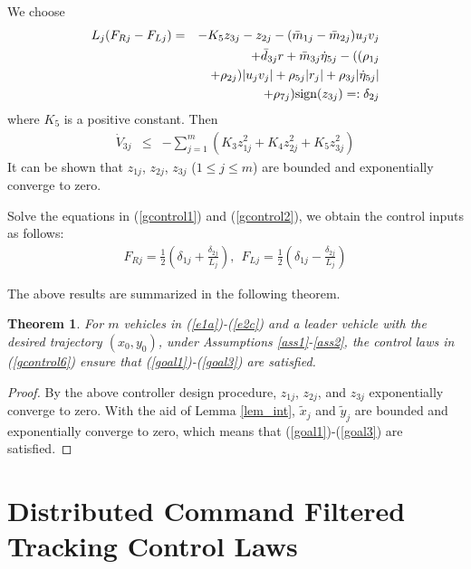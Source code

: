 \documentclass[letterpaper, 10 pt, conference]{ieeeconf}  %
\newtheorem{theorem}{Theorem}
\begin{document}
We choose
\begin{eqnarray}
L_j(F_{Rj}-F_{Lj})&=&-K_5z_{3j}-z_{2j}-(\bar{m}_{1j}-\bar{m}_{2j})u_jv_j\nonumber\\
&&+\bar{d}_{3j}r+\bar{m}_{3j}\dot{{\eta}}_{5j}-((\rho_{1j}\nonumber\\
&&+\rho_{2j})|u_jv_j|+\rho_{5j}|r_j|+\rho_{3j}|\dot{{\eta}}_{5j}|\nonumber\\
&&+\rho_{7j}){\rm sign}(z_{3j})=:\delta_{2j}\label{gcontrol2}
\end{eqnarray}
where $K_5$ is a positive constant. Then
\begin{eqnarray*}
\dot{V}_{3j}&\leq &
-\sum^m_{j=1}(K_{3}z^2_{1j}+K_{4}z^2_{2j}+K_5z^2_{3j})
\end{eqnarray*}
It can be shown
that  $z_{1j}$, $z_{2j}$, $z_{3j}$ ($1\leq j\leq m$) are bounded and
exponentially converge to zero.

Solve the equations in (\ref{gcontrol1}) and (\ref{gcontrol2}), we
obtain the control inputs as follows:
\begin{eqnarray}
F_{Rj}=\frac{1}{2}\left(\delta_{1j}+\frac{\delta_{2j}}{L_j} \right),~~
F_{Lj}=\frac{1}{2}\left(\delta_{1j}-\frac{\delta_{2j}}{L_j}
\right)\label{gcontrol6}
\end{eqnarray}

The above results are summarized in the following theorem.

\begin{theorem}
For $m$ vehicles  in (\ref{e1a})-(\ref{e2c}) and a leader vehicle with the desired trajectory
$(x_0,y_0)$, under Assumptions \ref{ass1}-\ref{ass2}, the control
laws in (\ref{gcontrol6}) ensure that (\ref{goal1})-(\ref{goal3}) are satisfied.
\label{gthe1}
\end{theorem}

\begin{proof}
By the above controller design procedure, $z_{1j}$, $z_{2j}$, and $z_{3j}$ exponentially converge to zero. With the aid of Lemma \ref{lem_int}, $\tilde{x}_j$ and $\tilde{y}_j$ are bounded and exponentially converge to zero,   
which
means that (\ref{goal1})-(\ref{goal3}) are satisfied.
\end{proof}


\section{Distributed Command Filtered Tracking Control Laws}
\label{sec4b}
\end{document}
